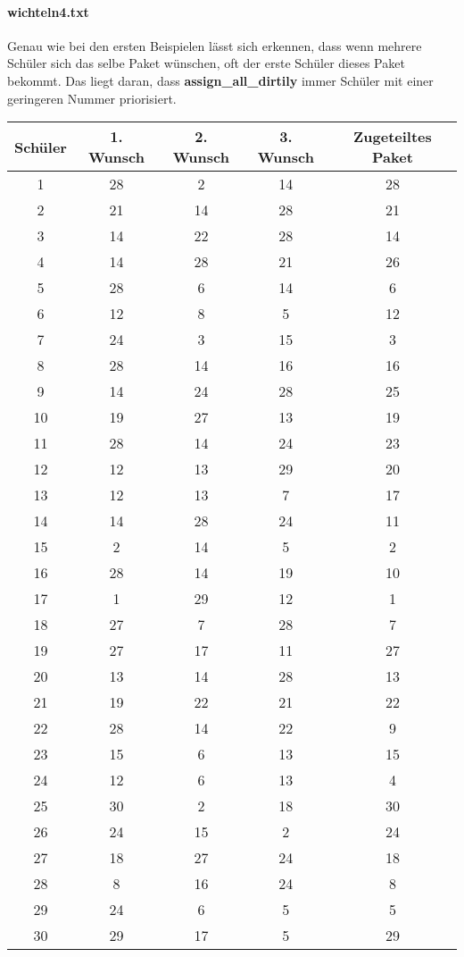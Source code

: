 \documentclass[a4paper,10pt,ngerman]{scrartcl}
\begin{document}
\paragraph{wichteln4.txt}
Genau wie bei den ersten Beispielen lässt sich erkennen, dass wenn mehrere Schüler sich das selbe Paket wünschen, oft der erste Schüler dieses Paket bekommt.
Das liegt daran, dass \textbf{assign\_all\_dirtily} immer Schüler mit einer geringeren Nummer priorisiert.
\begin{longtable}[c]{c|c|c|c|c}
    Schüler & 1. Wunsch & 2. Wunsch & 3. Wunsch & Zugeteiltes Paket \\
    \hline
    \endhead
    1 & 28 & 2 & 14 & 28 \\
    2 & 21 & 14 & 28 & 21 \\
    3 & 14 & 22 & 28 & 14 \\
    4 & 14 & 28 & 21 & 26 \\
    5 & 28 & 6 & 14 & 6 \\
    6 & 12 & 8 & 5 & 12 \\
    7 & 24 & 3 & 15 & 3 \\
    8 & 28 & 14 & 16 & 16 \\
    9 & 14 & 24 & 28 & 25 \\
    10 & 19 & 27 & 13 & 19 \\
    11 & 28 & 14 & 24 & 23 \\
    12 & 12 & 13 & 29 & 20 \\
    13 & 12 & 13 & 7 & 17 \\
    14 & 14 & 28 & 24 & 11 \\
    15 & 2 & 14 & 5 & 2 \\
    16 & 28 & 14 & 19 & 10 \\
    17 & 1 & 29 & 12 & 1 \\
    18 & 27 & 7 & 28 & 7 \\
    19 & 27 & 17 & 11 & 27 \\
    20 & 13 & 14 & 28 & 13 \\
    21 & 19 & 22 & 21 & 22 \\
    22 & 28 & 14 & 22 & 9 \\
    23 & 15 & 6 & 13 & 15 \\
    24 & 12 & 6 & 13 & 4 \\
    25 & 30 & 2 & 18 & 30 \\
    26 & 24 & 15 & 2 & 24 \\
    27 & 18 & 27 & 24 & 18 \\
    28 & 8 & 16 & 24 & 8 \\
    29 & 24 & 6 & 5 & 5 \\
    30 & 29 & 17 & 5 & 29
\end{longtable}
\end{document}
